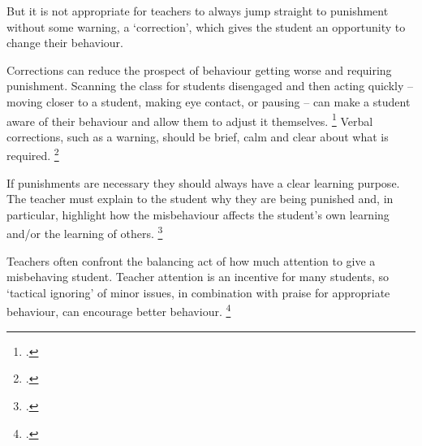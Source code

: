 \documentclass[FrontPage]{grattan}
\begin{document}
But it is not appropriate for teachers to always jump straight to punishment without some warning, a `correction', which gives the student an opportunity to change their behaviour. 
 
Corrections can reduce the prospect of behaviour getting worse and requiring punishment. Scanning the class for students disengaged and then acting quickly – moving closer to a student, making eye contact, or pausing – can make a student aware of their behaviour and allow them to adjust it themselves.%
    \footcites{Lewis2011DevelopmentalManagementApproach}{Rogers2015ClassroomBehaviourPractical} 
Verbal corrections, such as a warning, should be brief, calm and clear about what is required.%
    \footcite{Simonsen2008EvidenceBasedPractices}

If punishments are necessary they should always have a clear learning purpose. The teacher must explain to the student why they are being punished and, in particular, highlight how the misbehaviour affects the student’s own learning and/or the learning of others.%
    \footcites{Lewis2011DevelopmentalManagementApproach}{Rogers2015ClassroomBehaviourPractical}

Teachers often confront the balancing act of how much attention to give a misbehaving student. Teacher attention is an incentive for many students, so `tactical ignoring’ of minor issues, in combination with praise for appropriate behaviour, can encourage better behaviour.%
    \footcite{Simonsen2008EvidenceBasedPractices}
\end{document}
